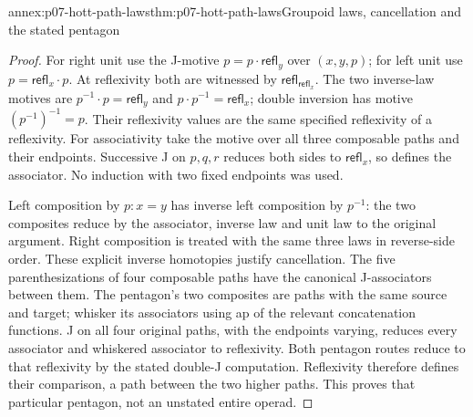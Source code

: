 \begin{annexitem}{annex:p07-hott-path-laws}{thm:p07-hott-path-laws}{Groupoid laws, cancellation and the stated pentagon}
\begin{proof}
For right unit use the J-motive $p=p\cdot\mathsf{refl}_y$ over
$(x,y,p)$; for left unit use $p=\mathsf{refl}_x\cdot p$. At reflexivity
both are witnessed by $\mathsf{refl}_{\mathsf{refl}_x}$.
The two inverse-law motives are $p^{-1}\cdot p=\mathsf{refl}_y$ and
$p\cdot p^{-1}=\mathsf{refl}_x$; double inversion has motive
$(p^{-1})^{-1}=p$. Their reflexivity values are the same specified
reflexivity of a reflexivity. For associativity take the motive over
all three composable paths and their endpoints. Successive J on $p,q,r$
reduces both sides to $\mathsf{refl}_x$, so defines the associator.
No induction with two fixed endpoints was used.

Left composition by $p:x=y$ has inverse left composition by $p^{-1}$:
the two composites reduce by the associator, inverse law and unit law
to the original argument. Right composition is treated with the same
three laws in reverse-side order. These explicit inverse homotopies
justify cancellation. The five parenthesizations of four composable
paths have the canonical J-associators between them. The pentagon's
two composites are paths with the same source and target; whisker its
associators using ap of the relevant concatenation functions. J on all
four original paths, with the endpoints varying, reduces every associator
and whiskered associator to reflexivity. Both pentagon routes reduce
to that reflexivity by the stated double-J computation. Reflexivity
therefore defines their comparison, a path between the two higher paths.
This proves that particular pentagon, not an unstated entire operad.
\end{proof}
\end{annexitem}

